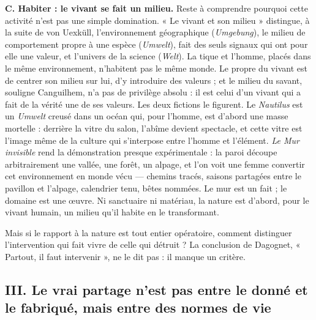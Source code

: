 \documentclass[11pt,a4paper]{article}
\begin{document}
\textbf{C. Habiter : le vivant se fait un milieu.} Reste à comprendre pourquoi cette activité n'est pas une simple domination. « Le vivant et son milieu » distingue, à la suite de von Uexküll, l'environnement géographique (\emph{Umgebung}), le milieu de comportement propre à une espèce (\emph{Umwelt}), fait des seuls signaux qui ont pour elle une valeur, et l'univers de la science (\emph{Welt}). La tique et l'homme, placés dans le même environnement, n'habitent pas le même monde. Le propre du vivant est de centrer son milieu sur lui, d'y introduire des valeurs ; et le milieu du savant, souligne Canguilhem, n'a pas de privilège absolu : il est celui d'un vivant qui a fait de la vérité une de ses valeurs. Les deux fictions le figurent. Le \emph{Nautilus} est un \emph{Umwelt} creusé dans un océan qui, pour l'homme, est d'abord une masse mortelle : derrière la vitre du salon, l'abîme devient spectacle, et cette vitre est l'image même de la culture qui s'interpose entre l'homme et l'élément. \emph{Le Mur invisible} rend la démonstration presque expérimentale : la paroi découpe arbitrairement une vallée, une forêt, un alpage, et l'on voit une femme convertir cet environnement en monde vécu --- chemins tracés, saisons partagées entre le pavillon et l'alpage, calendrier tenu, bêtes nommées. Le mur est un fait ; le domaine est une œuvre. Ni sanctuaire ni matériau, la nature est d'abord, pour le vivant humain, un milieu qu'il habite en le transformant.

Mais si le rapport à la nature est tout entier opératoire, comment distinguer l'intervention qui fait vivre de celle qui détruit ? La conclusion de Dagognet, « Partout, il faut intervenir », ne le dit pas : il manque un critère.

\hypertarget{iii.-le-vrai-partage-nest-pas-entre-le-donnuxe9-et-le-fabriquuxe9-mais-entre-des-normes-de-vie}{%
\subsection{III. Le vrai partage n'est pas entre le donné et le fabriqué, mais entre des normes de vie}\label{iii.-le-vrai-partage-nest-pas-entre-le-donnuxe9-et-le-fabriquuxe9-mais-entre-des-normes-de-vie}}
\end{document}
